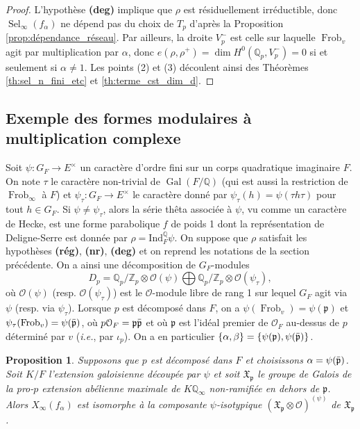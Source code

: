 \documentclass[12pt]{amsart}
\newcommand\bQ{\mathbb{Q}}
\newcommand\Zp{{\mathbb{Z}_{p}}}
\newcommand\Qp{\mathbb{Q}_{p}}
\newcommand\cO{\mathcal{O}}
\newcommand\gp{\mathfrak{p}}
\newcommand\gX{\mathfrak{X}}
\newcommand{\ob}[1]{\mkern 1.5mu\overline{\mkern-1.5mu#1\mkern-1.5mu}\mkern 1.5mu}
\newcommand{\Ind}{\mathrm{Ind}}
\DeclareMathOperator{\Gal}{Gal}
\DeclareMathOperator{\Frob}{Frob}
\DeclareMathOperator{\Sel}{Sel}
\theoremstyle{defstyle}
\theoremstyle{thmstyle}
\newtheorem{proposition}[subsubsection]{Proposition}
\begin{document}
\begin{proof}	
	L'hypothèse \textbf{(deg)} implique que $\rho$ est résiduellement irréductible, donc $\Sel_\infty(f_\alpha)$ ne dépend pas du choix de $T_p$ d'après la Proposition \ref{prop:dépendance_réseau}. Par ailleurs, la droite $V_p^-$ est celle sur laquelle $\Frob_v$ agit par multiplication par $\alpha$, donc $e(\rho,\rho^+)=\dim H^0(\Qp,V_p^-)=0$ si et seulement si $\alpha\neq 1$. Les points (2) et (3) découlent ainsi des Théorèmes \ref{th:sel_n_fini_etc} et \ref{th:terme_cst_dim_d}.
\end{proof}

\subsection{Exemple des formes modulaires à multiplication complexe} \label{sec:CM}
Soit $\psi : G_F \longrightarrow E^\times$ un caractère d'ordre fini sur un corps quadratique imaginaire $F$. On note $\tau$ le caractère non-trivial de $\Gal(F/\bQ)$ (qui est aussi la restriction de $\Frob_\infty$ à $F$) et $\psi_\tau : G_F \longrightarrow E^\times$ le caractère donné par $\psi_\tau(h)=\psi(\tau h \tau)$ pour tout $h\in G_F$.  Si $\psi \neq \psi_\tau$, alors la série thêta associée à $\psi$, vu comme un caractère de Hecke, est une forme parabolique $f$ de poids 1 dont la représentation de Deligne-Serre est donnée par $\rho=\Ind_F^{\bQ} \psi$. On suppose que $\rho$ satisfait les hypothèses \textbf{(rég)}, \textbf{(nr)}, \textbf{(deg)} et on reprend les notations de la section précédente. On a ainsi une décomposition de $G_F$-modules 
\begin{equation}\label{eq:decomposition_D_p_CM}
D_p=\Qp/\Zp \otimes \cO(\psi) \bigoplus \Qp/\Zp \otimes \cO(\psi_\tau), \end{equation}
où $\cO(\psi)$ (resp. $\cO(\psi_\tau)$) est le $\cO$-module libre de rang 1 sur lequel $G_F$ agit via $\psi$ (resp. via $\psi_\tau$). Lorsque $p$ est décomposé dans $F$, on a $\psi(\Frob_v)=\psi(\gp)$ et $\psi_\tau(\Frob_v)=\psi(\ob{\gp})$, où $p\cO_F=\gp\ob{\gp}$ et où $\gp$ est l'idéal premier de $\cO_F$ au-dessus de $p$ déterminé par $v$ (\textit{i.e.}, par $\iota_p$). On a en particulier $\{\alpha,\beta\}=\{\psi(\gp),\psi(\ob{\gp})\}$. 
\begin{proposition}\label{prop:sel_CM}
	Supposons que $p$ est décomposé dans $F$ et choisissons $\alpha=\psi(\ob{\gp})$. Soit $K/F$ l'extension galoisienne découpée par $\psi$ et soit $\gX_{\gp}$ le groupe de Galois de la pro-$p$ extension abélienne maximale de $K\bQ_\infty$ non-ramifiée en dehors de $\gp$. Alors $X_\infty(f_\alpha)$ est isomorphe à la composante $\psi$-isotypique $\left(\gX_\gp \otimes \cO\right)^{(\psi)}$ de $\gX_\gp$.
\end{proposition}
\end{document}
